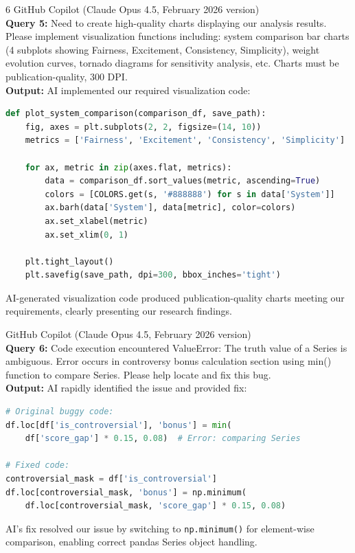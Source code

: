 \begin{ReportAiUse}{6}
GitHub Copilot (Claude Opus 4.5, February 2026 version)\\
\textbf{Query 5:} Need to create high-quality charts displaying our analysis results. Please implement visualization functions including: system comparison bar charts (4 subplots showing Fairness, Excitement, Consistency, Simplicity), weight evolution curves, tornado diagrams for sensitivity analysis, etc. Charts must be publication-quality, 300 DPI.\\
\textbf{Output:} AI implemented our required visualization code:
\begin{lstlisting}[language=python]
def plot_system_comparison(comparison_df, save_path):
    fig, axes = plt.subplots(2, 2, figsize=(14, 10))
    metrics = ['Fairness', 'Excitement', 'Consistency', 'Simplicity']
    
    for ax, metric in zip(axes.flat, metrics):
        data = comparison_df.sort_values(metric, ascending=True)
        colors = [COLORS.get(s, '#888888') for s in data['System']]
        ax.barh(data['System'], data[metric], color=colors)
        ax.set_xlabel(metric)
        ax.set_xlim(0, 1)
    
    plt.tight_layout()
    plt.savefig(save_path, dpi=300, bbox_inches='tight')
\end{lstlisting}
AI-generated visualization code produced publication-quality charts meeting our requirements, clearly presenting our research findings.

GitHub Copilot (Claude Opus 4.5, February 2026 version)\\
\textbf{Query 6:} Code execution encountered ValueError: The truth value of a Series is ambiguous. Error occurs in controversy bonus calculation section using min() function to compare Series. Please help locate and fix this bug.\\
\textbf{Output:} AI rapidly identified the issue and provided fix:
\begin{lstlisting}[language=python]
# Original buggy code:
df.loc[df['is_controversial'], 'bonus'] = min(
    df['score_gap'] * 0.15, 0.08)  # Error: comparing Series

# Fixed code:
controversial_mask = df['is_controversial']
df.loc[controversial_mask, 'bonus'] = np.minimum(
    df.loc[controversial_mask, 'score_gap'] * 0.15, 0.08)
\end{lstlisting}
AI's fix resolved our issue by switching to \texttt{np.minimum()} for element-wise comparison, enabling correct pandas Series object handling.

\end{ReportAiUse}